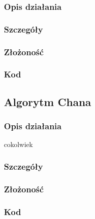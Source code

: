 \documentclass[11pt]{article}
\theoremstyle{remark} \newtheorem{definition}{def.}
\theoremstyle{definition} \newtheorem{twierdzenie}{tw.}
\begin{document}
    \subsubsection{Opis działania}
    \subsubsection{Szczegóły}
    \subsubsection{Złożoność}
    \subsubsection{Kod}



\subsection{Algorytm Chana}
    \subsubsection{Opis działania}
    cokolwiek \cite{markdeberg}
    \subsubsection{Szczegóły}
    \subsubsection{Złożoność}
    \subsubsection{Kod}
    
    
    
    \medskip

\printbibliography
\end{document}
